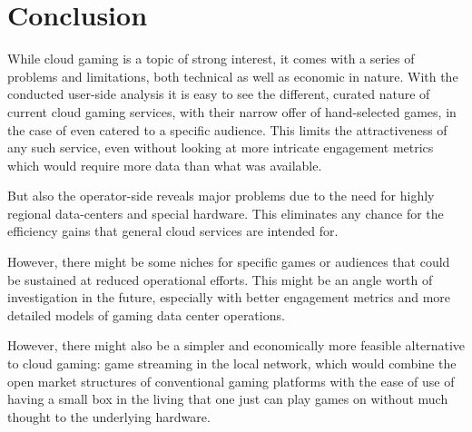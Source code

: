 \section{Conclusion}
\label{sec:conclusion}

While cloud gaming is a topic of strong interest, it comes with a series of problems and limitations, both technical as well as economic in nature. With the conducted user-side analysis it is easy to see the different, curated nature of current cloud gaming services, with their narrow offer of hand-selected games, in the case of \psnow even catered to a specific audience. This limits the attractiveness of any such service, even without looking at more intricate engagement metrics which would require more data than what was available.

But also the operator-side reveals major problems due to the need for highly regional data-centers and special hardware. This eliminates any chance for the efficiency gains that general cloud services are intended for.

However, there might be some niches for specific games or audiences that could be sustained at reduced operational efforts. This might be an angle worth of investigation in the future, especially with better engagement metrics and more detailed models of gaming data center operations.

However, there might also be a simpler and economically more feasible alternative to cloud gaming: game streaming in the local network, which would combine the open market structures of conventional gaming platforms with the ease of use of having a small box in the living that one just can play games on without much thought to the underlying hardware.